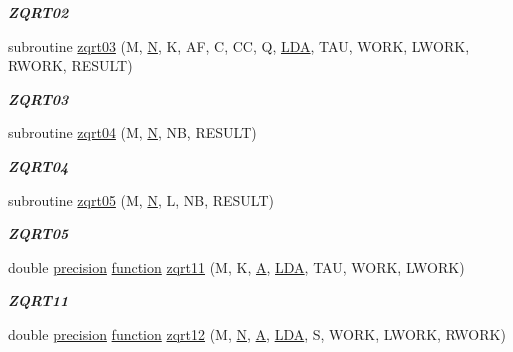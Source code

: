 \begin{DoxyCompactItemize}
\begin{DoxyCompactList}\small\item\em {\bfseries Z\+Q\+R\+T02} \end{DoxyCompactList}\item 
subroutine \hyperlink{group__complex16__lin_ga5a62f7cf4b997a1b2ecdc6d0c91dda86}{zqrt03} (M, \hyperlink{polmisc_8c_a0240ac851181b84ac374872dc5434ee4}{N}, K, A\+F, C, C\+C, Q, \hyperlink{example__user_8c_ae946da542ce0db94dced19b2ecefd1aa}{L\+D\+A}, T\+A\+U, W\+O\+R\+K, L\+W\+O\+R\+K, R\+W\+O\+R\+K, R\+E\+S\+U\+L\+T)
\begin{DoxyCompactList}\small\item\em {\bfseries Z\+Q\+R\+T03} \end{DoxyCompactList}\item 
subroutine \hyperlink{group__complex16__lin_ga7117135ef49211eded4d2518ab2438ac}{zqrt04} (M, \hyperlink{polmisc_8c_a0240ac851181b84ac374872dc5434ee4}{N}, N\+B, R\+E\+S\+U\+L\+T)
\begin{DoxyCompactList}\small\item\em {\bfseries Z\+Q\+R\+T04} \end{DoxyCompactList}\item 
subroutine \hyperlink{group__complex16__lin_ga4b67e894aaa9446001baffcf8bd1ee3e}{zqrt05} (M, \hyperlink{polmisc_8c_a0240ac851181b84ac374872dc5434ee4}{N}, L, N\+B, R\+E\+S\+U\+L\+T)
\begin{DoxyCompactList}\small\item\em {\bfseries Z\+Q\+R\+T05} \end{DoxyCompactList}\item 
double \hyperlink{numinquire_8h_a2c8e616467665d0b2814d4c1589ba74e}{precision} \hyperlink{afunc_8m_a7b5e596df91eadea6c537c0825e894a7}{function} \hyperlink{group__complex16__lin_ga8bfd9481675cbd64deb8bcdeaaf7d093}{zqrt11} (M, K, \hyperlink{classA}{A}, \hyperlink{example__user_8c_ae946da542ce0db94dced19b2ecefd1aa}{L\+D\+A}, T\+A\+U, W\+O\+R\+K, L\+W\+O\+R\+K)
\begin{DoxyCompactList}\small\item\em {\bfseries Z\+Q\+R\+T11} \end{DoxyCompactList}\item 
double \hyperlink{numinquire_8h_a2c8e616467665d0b2814d4c1589ba74e}{precision} \hyperlink{afunc_8m_a7b5e596df91eadea6c537c0825e894a7}{function} \hyperlink{group__complex16__lin_ga0d325cbc88970971a5673c0270522854}{zqrt12} (M, \hyperlink{polmisc_8c_a0240ac851181b84ac374872dc5434ee4}{N}, \hyperlink{classA}{A}, \hyperlink{example__user_8c_ae946da542ce0db94dced19b2ecefd1aa}{L\+D\+A}, S, W\+O\+R\+K, L\+W\+O\+R\+K, R\+W\+O\+R\+K)

\end{DoxyCompactItemize}
